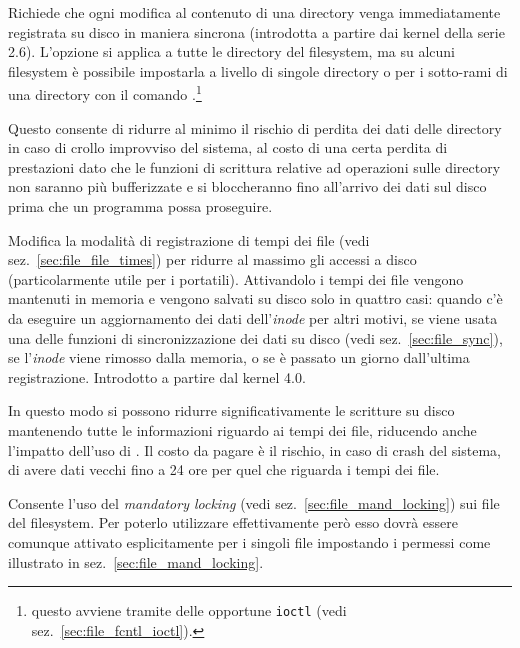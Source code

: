 \begin{basedescript}{\desclabelwidth{2.0cm}\desclabelstyle{\nextlinelabel}}
\item[\constd{MS\_DIRSYNC}] Richiede che ogni modifica al contenuto di una
  directory venga immediatamente registrata su disco in maniera sincrona
  (introdotta a partire dai kernel della serie 2.6). L'opzione si applica a
  tutte le directory del filesystem, ma su alcuni filesystem è possibile
  impostarla a livello di singole directory o per i sotto-rami di una directory
  con il comando .\footnote{questo avviene tramite delle opportune
    \texttt{ioctl} (vedi sez.~\ref{sec:file_fcntl_ioctl}).}

  Questo consente di ridurre al minimo il rischio di perdita dei dati delle
  directory in caso di crollo improvviso del sistema, al costo di una certa
  perdita di prestazioni dato che le funzioni di scrittura relative ad
  operazioni sulle directory non saranno più bufferizzate e si bloccheranno
  fino all'arrivo dei dati sul disco prima che un programma possa proseguire.

\item[\constd{MS\_LAZYTIME}] Modifica la modalità di registrazione di tempi
  dei file (vedi sez.~\ref{sec:file_file_times}) per ridurre al massimo gli
  accessi a disco (particolarmente utile per i portatili). Attivandolo i tempi
  dei file vengono mantenuti in memoria e vengono salvati su disco solo in
  quattro casi: quando c'è da eseguire un aggiornamento dei dati
  dell'\textit{inode} per altri motivi, se viene usata una delle funzioni di
  sincronizzazione dei dati su disco (vedi sez.~\ref{sec:file_sync}), se
  l'\textit{inode} viene rimosso dalla memoria, o se è passato un giorno
  dall'ultima registrazione. Introdotto a partire dal kernel 4.0.

  In questo modo si possono ridurre significativamente le scritture su disco
  mantenendo tutte le informazioni riguardo ai tempi dei file, riducendo anche
  l'impatto dell'uso di . Il costo da pagare è il
  rischio, in caso di crash del sistema, di avere dati vecchi fino a 24 ore
  per quel che riguarda i tempi dei file.
  
\item[\constd{MS\_MANDLOCK}] Consente l'uso del \textit{mandatory locking}
  (vedi sez.~\ref{sec:file_mand_locking}) sui file del filesystem. Per poterlo
  utilizzare effettivamente però esso dovrà essere comunque attivato
  esplicitamente per i singoli file impostando i permessi come illustrato in
  sez.~\ref{sec:file_mand_locking}.


\end{basedescript}
